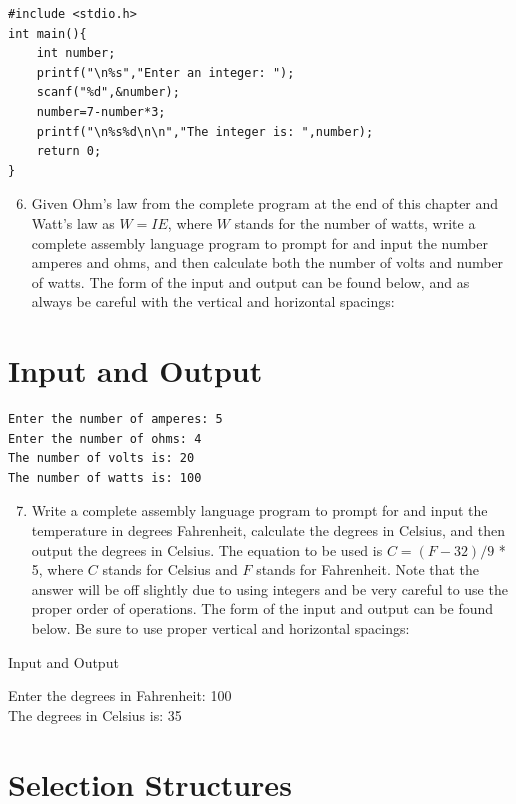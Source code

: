 \documentclass[10pt]{book}
\begin{document}
\begin{verbatim}
#include <stdio.h>
int main(){
    int number;
    printf("\n%s","Enter an integer: ");
    scanf("%d",&number);
    number=7-number*3;
    printf("\n%s%d\n\n","The integer is: ",number);
    return 0;
}
\end{verbatim}

\begin{enumerate}
  \setcounter{enumi}{5}
  \item Given Ohm's law from the complete program at the end of this chapter and Watt's law as $W=I E$, where $W$ stands for the number of watts, write a complete assembly language program to prompt for and input the number amperes and ohms, and then calculate both the number of volts and number of watts. The form of the input and output can be found below, and as always be careful with the vertical and horizontal spacings:
\end{enumerate}

\section*{Input and Output}
\begin{verbatim}
Enter the number of amperes: 5
Enter the number of ohms: 4
The number of volts is: 20
The number of watts is: 100
\end{verbatim}

\begin{enumerate}
  \setcounter{enumi}{6}
  \item Write a complete assembly language program to prompt for and input the temperature in degrees Fahrenheit, calculate the degrees in Celsius, and then output the degrees in Celsius. The equation to be used is $C=(F-32) / 9$ * 5, where $C$ stands for Celsius and $F$ stands for Fahrenheit. Note that the answer will be off slightly due to using integers and be very careful to use the proper order of operations. The form of the input and output can be found below. Be sure to use proper vertical and horizontal spacings:
\end{enumerate}

Input and Output

Enter the degrees in Fahrenheit: 100\\
The degrees in Celsius is: 35

\section*{Selection Structures}
\end{document}
